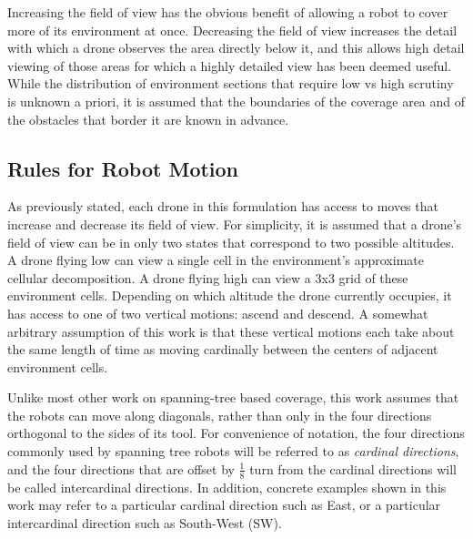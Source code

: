 Increasing the field of view has the obvious benefit of allowing a robot to cover more of its environment at once. Decreasing the field of view increases the detail with which a drone observes the area directly below it, and this allows high detail viewing of those areas for which a highly detailed view has been deemed useful. While the distribution of environment sections that require low vs high scrutiny is unknown a priori, it is assumed that the boundaries of the coverage area and of the obstacles that border it are known in advance.


\subsection{Rules for Robot Motion}

As previously stated, each drone in this formulation has access to moves that increase and decrease its field of view. For simplicity, it is assumed that a drone's field of view can be in only two states that correspond to two possible altitudes. A drone flying low can view a single cell in the environment's approximate cellular decomposition. A drone flying high can view a 3x3 grid of these environment cells. Depending on which altitude the drone currently occupies, it has access to one of two vertical motions: ascend and descend. A somewhat arbitrary assumption of this work is that these vertical motions each take about the same length of time as moving cardinally between the centers of adjacent environment cells.

Unlike most other work on spanning-tree based coverage, this work assumes that the robots can move along diagonals, rather than only in the four directions orthogonal to the sides of its tool. For convenience of notation, the four directions commonly used by spanning tree robots will be referred to as \textit{cardinal directions}, and the four directions that are offset by $\frac{1}{8}$ turn from the cardinal directions will be called intercardinal directions. In addition, concrete examples shown in this work may refer to a particular cardinal direction such as East, or a particular intercardinal direction such as South-West (SW).

